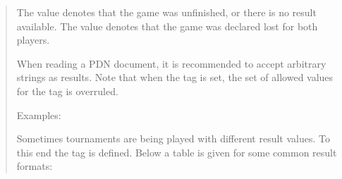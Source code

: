 \documentclass[letterpaper,10pt,english]{sphinxmanual}
\begin{document}
\begin{quote}
\sphinxAtStartPar
The value \sphinxcode{\sphinxupquote{*}} denotes that the game was unfinished, or there is no result available.
The value  denotes that the game was declared lost for both players.

\sphinxAtStartPar
When reading a PDN document, it is recommended to accept arbitrary strings as results.
Note that when the  tag is set, the set of allowed values for the 
tag is overruled.

\sphinxAtStartPar
Examples:

\begin{sphinxVerbatim}[commandchars=\\\{\}]
\PYG{p}{[} \PYG{p}{]}
\end{sphinxVerbatim}

\sphinxAtStartPar
Sometimes tournaments are being played with different result values. To this end the
 tag is defined. Below a table is given for some common result formats:



\end{quote}
\end{document}
